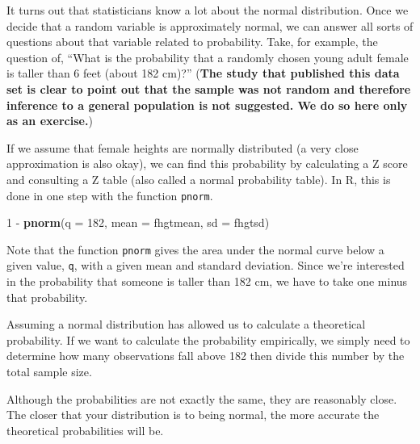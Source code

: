 \documentclass[]{book}
\newenvironment{Shaded}{\begin{snugshade}}{\end{snugshade}}
\newcommand{\KeywordTok}[1]{\textcolor[rgb]{0.13,0.29,0.53}{\textbf{{#1}}}}
\newcommand{\DataTypeTok}[1]{\textcolor[rgb]{0.13,0.29,0.53}{{#1}}}
\newcommand{\DecValTok}[1]{\textcolor[rgb]{0.00,0.00,0.81}{{#1}}}
\newcommand{\StringTok}[1]{\textcolor[rgb]{0.31,0.60,0.02}{{#1}}}
\newcommand{\NormalTok}[1]{{#1}}
\theoremstyle{definition}
\theoremstyle{definition}
\theoremstyle{definition}
\theoremstyle{remark}
\begin{document}
It turns out that statisticians know a lot about the normal
distribution. Once we decide that a random variable is approximately
normal, we can answer all sorts of questions about that variable related
to probability. Take, for example, the question of, ``What is the
probability that a randomly chosen young adult female is taller than 6
feet (about 182 cm)?'' (\textbf{The study that published this data set
is clear to point out that the sample was not random and therefore
inference to a general population is not suggested. We do so here only
as an exercise.})

If we assume that female heights are normally distributed (a very close
approximation is also okay), we can find this probability by calculating
a Z score and consulting a Z table (also called a normal probability
table). In R, this is done in one step with the function \texttt{pnorm}.

\begin{Shaded}
\begin{Highlighting}[]
\DecValTok{1} \NormalTok{-}\StringTok{ }\KeywordTok{pnorm}\NormalTok{(}\DataTypeTok{q =} \DecValTok{182}\NormalTok{, }\DataTypeTok{mean =} \NormalTok{fhgtmean, }\DataTypeTok{sd =} \NormalTok{fhgtsd)}
\end{Highlighting}
\end{Shaded}

Note that the function \texttt{pnorm} gives the area under the normal
curve below a given value, \texttt{q}, with a given mean and standard
deviation. Since we're interested in the probability that someone is
taller than 182 cm, we have to take one minus that probability.

Assuming a normal distribution has allowed us to calculate a theoretical
probability. If we want to calculate the probability empirically, we
simply need to determine how many observations fall above 182 then
divide this number by the total sample size.

\begin{Shaded}
\end{Shaded}

Although the probabilities are not exactly the same, they are reasonably
close. The closer that your distribution is to being normal, the more
accurate the theoretical probabilities will be.
\end{document}
